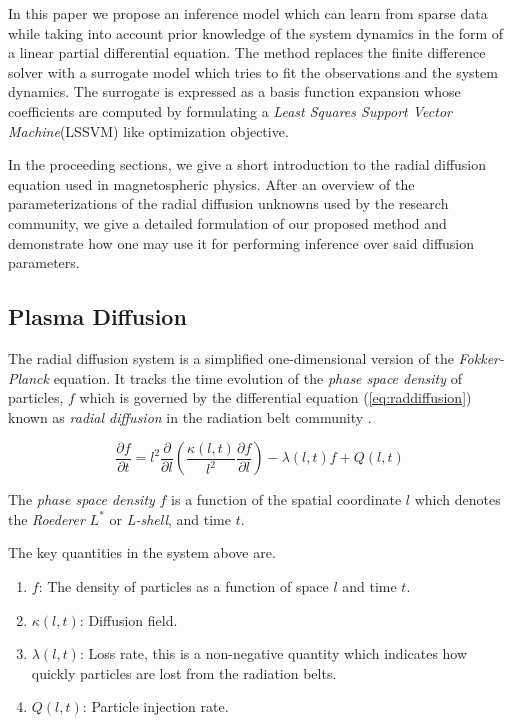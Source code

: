 In this paper we propose an inference model which can learn from sparse
data while taking into account prior knowledge of the system dynamics
in the form of a linear partial differential equation. The method replaces
the finite difference solver with a surrogate model which tries to fit
the observations and the system dynamics. The surrogate is expressed as
a basis function expansion whose coefficients are computed by formulating
a \emph{Least Squares Support Vector Machine}(LSSVM) like optimization
objective.

In the proceeding sections, we give a short introduction to the radial 
diffusion equation used in magnetospheric physics. After an overview of 
the parameterizations of the radial diffusion unknowns used by the research community, 
we give a detailed formulation of our proposed method and demonstrate 
how one may use it for performing inference over said diffusion parameters.

\subsection{Plasma Diffusion}

The radial diffusion system is a simplified one-dimensional version of
the \emph{Fokker-Planck} equation. It tracks the time evolution of the
\emph{phase space density} of particles, $f$ which is governed by the
differential equation (\ref{eq:raddiffusion}) known as \emph{radial
  diffusion} in the radiation belt community \citep{JGRA:JGRA9345}.

\begin{equation}\label{eq:raddiffusion}
  \frac{\partial{f}}{\partial{t}} = l^2 \frac{\partial}{\partial{l}}\left( \frac{\kappa(l,
      t)}{l^{2}} \frac{\partial{f}}{\partial{l}} \right) - \lambda(l,
  t) f +  Q(l, t)
\end{equation}

The \emph{phase space density} $f$ is a function of the spatial
coordinate $l$ which denotes the \emph{Roederer} $L^*$ or
\emph{L-shell}, and time $t$.

The key quantities in the system above are.

\begin{enumerate}
\item $f$: The density of particles as a function of space $l$ and
  time $t$.
\item $\kappa(l, t)$: Diffusion field.
\item $\lambda(l, t)$: Loss rate, this is a non-negative
  quantity which indicates how quickly particles are lost from the
  radiation belts.
\item $Q(l, t)$: Particle injection rate.
\end{enumerate}

